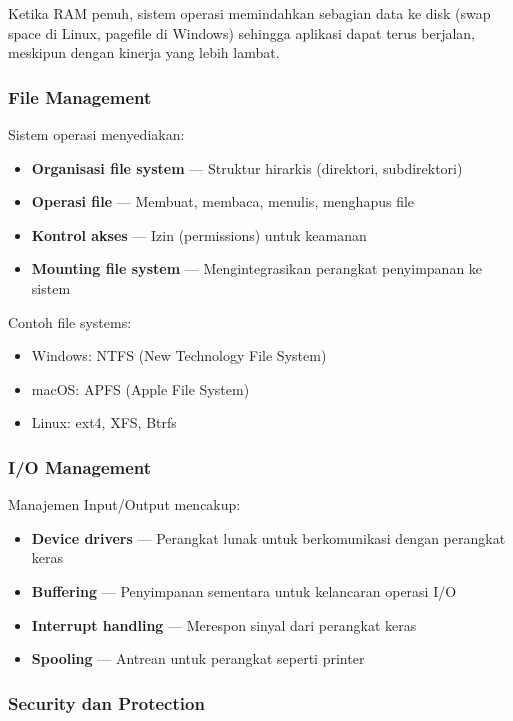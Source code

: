 \begin{examplebox}
Ketika RAM penuh, sistem operasi memindahkan sebagian data ke disk (swap space di Linux, pagefile di Windows) sehingga aplikasi dapat terus berjalan, meskipun dengan kinerja yang lebih lambat.
\end{examplebox}

\subsubsection{File Management}

Sistem operasi menyediakan:
\begin{itemize}
    \item \textbf{Organisasi file system} --- Struktur hirarkis (direktori, subdirektori)
    \item \textbf{Operasi file} --- Membuat, membaca, menulis, menghapus file
    \item \textbf{Kontrol akses} --- Izin (permissions) untuk keamanan
    \item \textbf{Mounting file system} --- Mengintegrasikan perangkat penyimpanan ke sistem
\end{itemize}

Contoh file systems:
\begin{itemize}
    \item Windows: NTFS (New Technology File System)
    \item macOS: APFS (Apple File System)
    \item Linux: ext4, XFS, Btrfs
\end{itemize}

\subsubsection{I/O Management}

Manajemen Input/Output mencakup:
\begin{itemize}
    \item \textbf{Device drivers} --- Perangkat lunak untuk berkomunikasi dengan perangkat keras
    \item \textbf{Buffering} --- Penyimpanan sementara untuk kelancaran operasi I/O
    \item \textbf{Interrupt handling} --- Merespon sinyal dari perangkat keras
    \item \textbf{Spooling} --- Antrean untuk perangkat seperti printer
\end{itemize}

\subsubsection{Security dan Protection}

